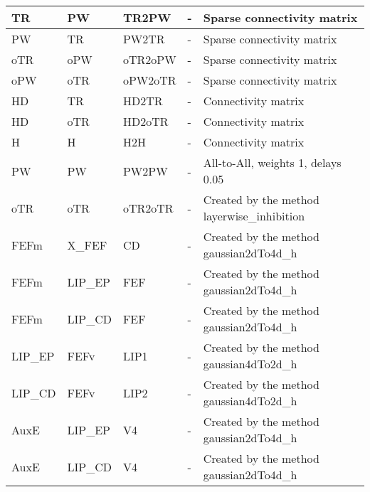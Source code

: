 \documentclass{article}
\begin{document}
\begin{xltabular}{\linewidth}{|l|l|l|X|X|}
    TR & PW & TR2PW & - &
    Sparse connectivity matrix \\ \hline

    PW & TR & PW2TR & - &
    Sparse connectivity matrix \\ \hline

    oTR & oPW & oTR2oPW & - &
    Sparse connectivity matrix \\ \hline

    oPW & oTR & oPW2oTR & - &
    Sparse connectivity matrix \\ \hline

    HD & TR & HD2TR & - &
    Connectivity matrix \\ \hline

    HD & oTR & HD2oTR & - &
    Connectivity matrix \\ \hline

    H & H & H2H & - &
    Connectivity matrix \\ \hline

    PW & PW & PW2PW & - &
    All-to-All, weights 1, delays 0.05 \\ \hline

    oTR & oTR & oTR2oTR & - &
    Created by the method layerwise\_inhibition \\ \hline

    FEFm & X\_FEF & CD & - &
    Created by the method gaussian2dTo4d\_h \\ \hline

    FEFm & LIP\_EP & FEF & - &
    Created by the method gaussian2dTo4d\_h \\ \hline

    FEFm & LIP\_CD & FEF & - &
    Created by the method gaussian2dTo4d\_h \\ \hline

    LIP\_EP & FEFv & LIP1 & - &
    Created by the method gaussian4dTo2d\_h \\ \hline

    LIP\_CD & FEFv & LIP2 & - &
    Created by the method gaussian4dTo2d\_h \\ \hline

    AuxE & LIP\_EP & V4 & - &
    Created by the method gaussian2dTo4d\_h \\ \hline

    AuxE & LIP\_CD & V4 & - &
    Created by the method gaussian2dTo4d\_h \\ \hline
 
\end{xltabular}
\end{document}
